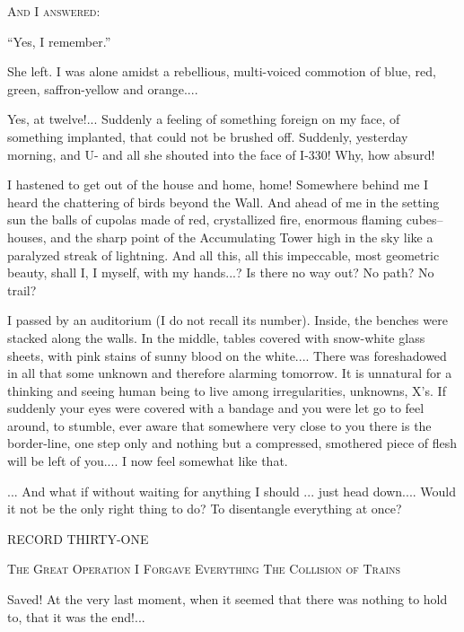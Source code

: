 \documentclass[11pt,openany]{book}
\begin{document}
\begin{center}\textsc{And I answered:}\end{center}

``Yes, I remember.''

She left. I was alone amidst a rebellious, multi-voiced commotion of blue, red, green, saffron-yellow and orange....

Yes, at twelve!... Suddenly a feeling of something foreign on my face, of something implanted, that could not be brushed off. Suddenly, yesterday morning, and U- and all she shouted into the face of I-330! Why, how absurd!

I hastened to get out of the house and home, home! Somewhere behind me I heard the chattering of birds beyond the Wall. And ahead of me in the setting sun the balls of cupolas made of red, crystallized fire, enormous flaming cubes--houses, and the sharp point of the Accumulating Tower high in the sky like a paralyzed streak of lightning. And all this, all this impeccable, most geometric beauty, shall I, I myself, with my hands...? Is there no way out? No path? No trail?

I passed by an auditorium (I do not recall its number). Inside, the benches were stacked along the walls. In the middle, tables covered with snow-white glass sheets, with pink stains of sunny blood on the white.... There was foreshadowed in all that some unknown and therefore alarming tomorrow. It is unnatural for a thinking and seeing human being to live among irregularities, unknowns, X's. If suddenly your eyes were covered with a bandage and you were let go to feel around, to stumble, ever aware that somewhere very close to you there is the border-line, one step only and nothing but a compressed, smothered piece of flesh will be left of you.... I now feel somewhat like that.

... And what if without waiting for anything I should ... just head down.... Would it not be the only right thing to do? To disentangle everything at once?

\begin{center}\textsc{RECORD THIRTY-ONE}\end{center}

\begin{center}\textsc{The Great Operation I Forgave Everything The Collision of Trains}\end{center}

Saved! At the very last moment, when it seemed that there was nothing to hold to, that it was the end!...
\end{document}
